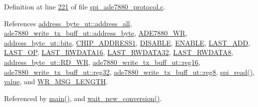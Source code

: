 Definition at line \hyperlink{a00039_source_l00221}{221} of file \hyperlink{a00039_source}{spi\-\_\-ade7880\-\_\-protocol.\-c}.



References \hyperlink{a00040_source_l00023}{address\-\_\-byte\-\_\-ut\-::address\-\_\-all}, \hyperlink{a00040_source_l00168}{ade7880\-\_\-write\-\_\-tx\-\_\-buff\-\_\-ut\-::address\-\_\-byte}, \hyperlink{a00040_source_l00013}{A\-D\-E7880\-\_\-\-W\-R}, \hyperlink{a00010_ae121725fb28cc26495969d71e0e0d42e}{address\-\_\-byte\-\_\-ut\-::bits}, \hyperlink{a00036_source_l00039}{C\-H\-I\-P\-\_\-\-A\-D\-D\-R\-E\-S\-S1}, \hyperlink{a00036_source_l00041}{D\-I\-S\-A\-B\-L\-E}, \hyperlink{a00036_source_l00040}{E\-N\-A\-B\-L\-E}, \hyperlink{a00035_source_l00314}{L\-A\-S\-T\-\_\-\-A\-D\-D}, \hyperlink{a00035_source_l00316}{L\-A\-S\-T\-\_\-\-O\-P}, \hyperlink{a00035_source_l00049}{L\-A\-S\-T\-\_\-\-R\-W\-D\-A\-T\-A16}, \hyperlink{a00035_source_l00050}{L\-A\-S\-T\-\_\-\-R\-W\-D\-A\-T\-A32}, \hyperlink{a00035_source_l00048}{L\-A\-S\-T\-\_\-\-R\-W\-D\-A\-T\-A8}, \hyperlink{a00040_source_l00026}{address\-\_\-byte\-\_\-ut\-::\-R\-D\-\_\-\-W\-R}, \hyperlink{a00040_source_l00172}{ade7880\-\_\-write\-\_\-tx\-\_\-buff\-\_\-ut\-::reg16}, \hyperlink{a00040_source_l00173}{ade7880\-\_\-write\-\_\-tx\-\_\-buff\-\_\-ut\-::reg32}, \hyperlink{a00040_source_l00171}{ade7880\-\_\-write\-\_\-tx\-\_\-buff\-\_\-ut\-::reg8}, \hyperlink{a00039_source_l00147}{spi\-\_\-read()}, \hyperlink{a00040_source_l00195}{value}, and \hyperlink{a00040_source_l00016}{W\-R\-\_\-\-M\-S\-G\-\_\-\-L\-E\-N\-G\-T\-H}.



Referenced by \hyperlink{a00034_source_l00198}{main()}, and \hyperlink{a00034_source_l00122}{wait\-\_\-new\-\_\-conversion()}.


